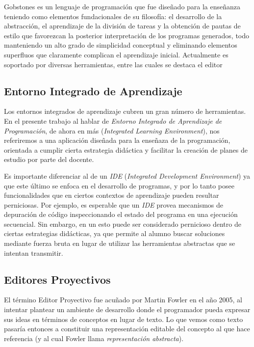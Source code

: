 Gobstones es un lenguaje de programación que fue diseñado para la enseñanza teniendo como elementos fundacionales de su filosofía: el desarrollo de la abstracción, el aprendizaje de la división de tareas y la obtención de pautas de estilo que favorezcan la posterior interpretación de los programas generados, todo manteniendo un alto grado de simplicidad conceptual y eliminando elementos superfluos que claramente complican el aprendizaje inicial. 
Actualmente es soportado por diversas herramientas, entre las cuales se destaca el editor \cite{PyGobstones}

\subsection{Entorno Integrado de Aprendizaje}

Los entornos integrados de aprendizaje\cite{IntegratedLearningEnvironment} cubren un gran número de herramientas. En el presente trabajo al hablar de \textit{Entorno Integrado de Aprendizaje de Programación}, de ahora en más \ile (\textit{Integrated Learning Environment}), nos referiremos a una aplicación diseñada para la enseñaza de la programación, orientada a cumplir cierta estrategia didáctica y facilitar la creación de planes de estudio por parte del docente. 

Es importante diferenciar al \ile de un \textit{IDE} (\textit{Integrated Development Environment}) ya que este último se enfoca en el desarrollo de programas, y por lo tanto posee funcionalidades que en ciertos contextos de aprendizaje pueden resultar perniciosas. Por ejemplo, es esperable que un \textit{IDE} provea mecanismos de depuración de código inspeccionando el estado del programa en una ejecución secuencial. Sin embargo, en un \ile esto puede ser considerado pernicioso dentro de ciertas estrategias didácticas, ya que permite al alumno buscar soluciones mediante fuerza bruta en lugar de utilizar las herramientas abstractas que se intentan transmitir.

\subsection{Editores Proyectivos}

El término Editor Proyectivo fue acuñado por Martin Fowler en el año 2005\cite{Fowler}, al intentar plantear un ambiente de desarrollo donde el programador pueda expresar sus ideas en términos de conceptos en lugar de texto. Lo que vemos como texto pasaría entonces a constituir una representación editable del concepto al que hace referencia (y al cual Fowler llama \textit{representación abstracta}).

